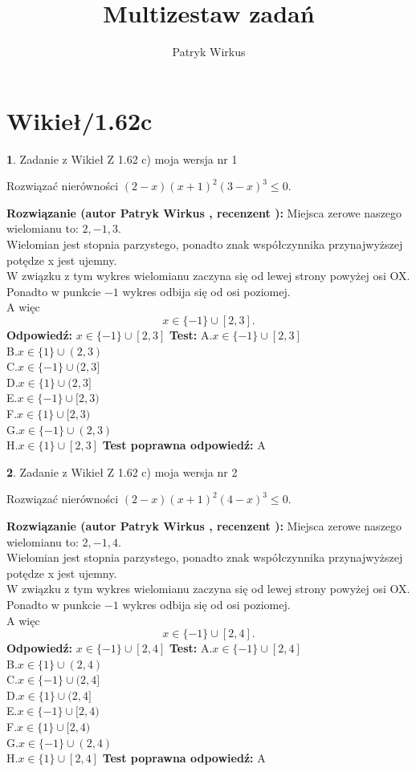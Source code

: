 \documentclass[12pt, a4paper]{article}
\title{Multizestaw zadań}
\author{Patryk Wirkus}
\date{}
\theoremstyle{definition} %
\newtheorem{zad}{}
\newcommand{\kategoria}[1]{\section{#1}}
\newcommand{\zadStart}[1]{\begin{zad}#1\newline}
\newcommand{\zadStop}{\end{zad}}
\newcommand{\rozwStart}[2]{\noindent \textbf{Rozwiązanie (autor #1 , recenzent #2): }\newline}
\newcommand{\rozwStop}{\newline}
\newcommand{\odpStart}{\noindent \textbf{Odpowiedź:}\newline}
\newcommand{\odpStop}{\newline}
\newcommand{\testStart}{\noindent \textbf{Test:}\newline}
\newcommand{\testStop}{\newline}
\newcommand{\kluczStart}{\noindent \textbf{Test poprawna odpowiedź:}\newline}
\newcommand{\kluczStop}{\newline}
\begin{document}
\maketitle

\kategoria{Wikieł/1.62c}


\zadStart{Zadanie z Wikieł Z 1.62 c) moja wersja nr 1}

Rozwiązać nierówności $(2-x)(x+1)^{2}(3-x)^{3}\le0$.
\zadStop
\rozwStart{Patryk Wirkus}{}
Miejsca zerowe naszego wielomianu to: $2, -1, 3$.\\
Wielomian jest stopnia parzystego, ponadto znak współczynnika przy\linebreak najwyższej potędze x jest ujemny.\\ W związku z tym wykres wielomianu zaczyna się od lewej strony powyżej osi OX.\\
Ponadto w punkcie $-1$ wykres odbija się od osi poziomej.\\
A więc $$x \in \{-1\} \cup [2,3].$$
\rozwStop
\odpStart
$x \in \{-1\} \cup [2,3]$
\odpStop
\testStart
A.$x \in \{-1\} \cup [2,3]$\\
B.$x \in \{1\} \cup (2,3)$\\
C.$x \in \{-1\} \cup (2,3]$\\
D.$x \in \{1\} \cup (2,3]$\\
E.$x \in \{-1\} \cup [2,3)$\\
F.$x \in \{1\} \cup [2,3)$\\
G.$x \in \{-1\} \cup (2,3)$\\
H.$x \in \{1\} \cup [2,3]$
\testStop
\kluczStart
A
\kluczStop



\zadStart{Zadanie z Wikieł Z 1.62 c) moja wersja nr 2}

Rozwiązać nierówności $(2-x)(x+1)^{2}(4-x)^{3}\le0$.
\zadStop
\rozwStart{Patryk Wirkus}{}
Miejsca zerowe naszego wielomianu to: $2, -1, 4$.\\
Wielomian jest stopnia parzystego, ponadto znak współczynnika przy\linebreak najwyższej potędze x jest ujemny.\\ W związku z tym wykres wielomianu zaczyna się od lewej strony powyżej osi OX.\\
Ponadto w punkcie $-1$ wykres odbija się od osi poziomej.\\
A więc $$x \in \{-1\} \cup [2,4].$$
\rozwStop
\odpStart
$x \in \{-1\} \cup [2,4]$
\odpStop
\testStart
A.$x \in \{-1\} \cup [2,4]$\\
B.$x \in \{1\} \cup (2,4)$\\
C.$x \in \{-1\} \cup (2,4]$\\
D.$x \in \{1\} \cup (2,4]$\\
E.$x \in \{-1\} \cup [2,4)$\\
F.$x \in \{1\} \cup [2,4)$\\
G.$x \in \{-1\} \cup (2,4)$\\
H.$x \in \{1\} \cup [2,4]$
\testStop
\kluczStart
A
\kluczStop
\end{document}
